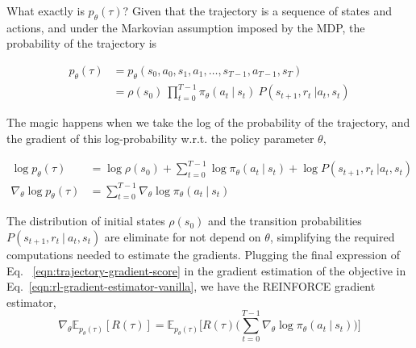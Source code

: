 What exactly is $p_{\theta}(\tau)$? Given that the trajectory is a sequence of
states and actions, and under the Markovian assumption imposed by the MDP, the
probability of the trajectory is 

\begin{equation}\label{eqn:trajectory-probability-expanded}
    \begin{split}
        p_{\theta}(\tau) &= p_\theta(s_{0}, a_{0}, s_{1}, a_{1}, \dots, s_{T-1}, a_{T-1}, s_{T}) \\
        &= \rho(s_0)~\prod_{t=0}^{T-1} \pi_{\theta}(a_{t}~|~s_{t})~P(s_{t+1}, r_{t}~|a_{t}, s_{t})
    \end{split}
\end{equation}

The magic happens when we take the log of the probability of the trajectory, and
the gradient of this log-probability w.r.t. the policy parameter $\theta$,

\begin{equation}\label{eqn:trajectory-gradient-score}
    \begin{split}
        \log p_{\theta}(\tau) &= \log \rho(s_0) + \sum_{t=0}^{T-1}\log \pi_{\theta}(a_{t}~|~s_{t}) + \log P(s_{t+1}, r_{t}~|a_{t}, s_{t}) \\
        \nabla_{\theta}\log p_{\theta}(\tau) &= \sum_{t=0}^{T-1}\nabla_{\theta}\log \pi_{\theta}(a_{t}~|~s_{t})
    \end{split}
\end{equation}

The distribution of initial states $\rho(s_{0})$ and the transition
probabilities $P(s_{t+1}, r_{t}~|~a_{t}, s_{t})$ are eliminate for not depend
on $\theta$, simplifying the required computations needed to estimate the
gradients. Plugging the final expression of Eq.~
\ref{eqn:trajectory-gradient-score} in the gradient estimation of the objective
in Eq.~\ref{eqn:rl-gradient-estimator-vanilla}, we have the REINFORCE gradient
estimator,
\begin{equation}\label{eqn:reinforce-gradient-estimator}
    \nabla_{\theta}\mathbb{E}_{p_{\theta}(\tau)}[R(\tau)] = \mathbb{E}_{p_{\theta}(\tau)}\bigg[R(\tau)\bigg(\sum_{t=0}^{T-1} \nabla_{\theta}\log \pi_{\theta} (a_t~|~s_t) \bigg)\bigg] 
\end{equation}


